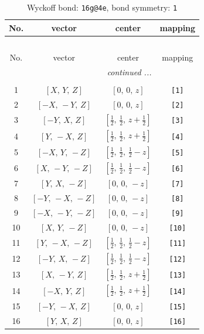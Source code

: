 \documentclass[fleqn,8pt]{jsarticle}
\begin{document}
\begin{longtable}{cccc}
\caption{Wyckoff bond: {\tt 16g@4e}, bond symmetry: {\tt 1}}
 \\
 \hline \hline
No. & vector & center & mapping \\ \hline \endfirsthead

\multicolumn{3}{l}{\tablename\ \thetable{}} \\
 \hline \hline
No. & vector & center & mapping \\ \hline \endhead

 \hline \hline
\multicolumn{3}{r}{\footnotesize\it continued ...} \\ \endfoot

 \hline \hline
\multicolumn{3}{r}{} \\ \endlastfoot

1 & $\left[ X,\, Y,\, Z \right]$ & $\left[ 0,\, 0,\, z \right]$ & {\tt [1]} \\ \hline
2 & $\left[ - X,\, - Y,\, Z \right]$ & $\left[ 0,\, 0,\, z \right]$ & {\tt [2]} \\ \hline
3 & $\left[ - Y,\, X,\, Z \right]$ & $\left[ \frac{1}{2},\, \frac{1}{2},\, z + \frac{1}{2} \right]$ & {\tt [3]} \\ \hline
4 & $\left[ Y,\, - X,\, Z \right]$ & $\left[ \frac{1}{2},\, \frac{1}{2},\, z + \frac{1}{2} \right]$ & {\tt [4]} \\ \hline
5 & $\left[ - X,\, Y,\, - Z \right]$ & $\left[ \frac{1}{2},\, \frac{1}{2},\, \frac{1}{2} - z \right]$ & {\tt [5]} \\ \hline
6 & $\left[ X,\, - Y,\, - Z \right]$ & $\left[ \frac{1}{2},\, \frac{1}{2},\, \frac{1}{2} - z \right]$ & {\tt [6]} \\ \hline
7 & $\left[ Y,\, X,\, - Z \right]$ & $\left[ 0,\, 0,\, - z \right]$ & {\tt [7]} \\ \hline
8 & $\left[ - Y,\, - X,\, - Z \right]$ & $\left[ 0,\, 0,\, - z \right]$ & {\tt [8]} \\ \hline
9 & $\left[ - X,\, - Y,\, - Z \right]$ & $\left[ 0,\, 0,\, - z \right]$ & {\tt [9]} \\ \hline
10 & $\left[ X,\, Y,\, - Z \right]$ & $\left[ 0,\, 0,\, - z \right]$ & {\tt [10]} \\ \hline
11 & $\left[ Y,\, - X,\, - Z \right]$ & $\left[ \frac{1}{2},\, \frac{1}{2},\, \frac{1}{2} - z \right]$ & {\tt [11]} \\ \hline
12 & $\left[ - Y,\, X,\, - Z \right]$ & $\left[ \frac{1}{2},\, \frac{1}{2},\, \frac{1}{2} - z \right]$ & {\tt [12]} \\ \hline
13 & $\left[ X,\, - Y,\, Z \right]$ & $\left[ \frac{1}{2},\, \frac{1}{2},\, z + \frac{1}{2} \right]$ & {\tt [13]} \\ \hline
14 & $\left[ - X,\, Y,\, Z \right]$ & $\left[ \frac{1}{2},\, \frac{1}{2},\, z + \frac{1}{2} \right]$ & {\tt [14]} \\ \hline
15 & $\left[ - Y,\, - X,\, Z \right]$ & $\left[ 0,\, 0,\, z \right]$ & {\tt [15]} \\ \hline
16 & $\left[ Y,\, X,\, Z \right]$ & $\left[ 0,\, 0,\, z \right]$ & {\tt [16]} \\
\end{longtable}
\end{document}
